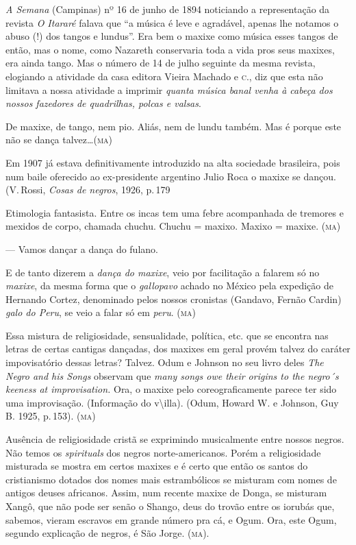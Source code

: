 \emph{A Semana} (Campinas) nº 16 de junho de 1894 noticiando a
representação da revista \emph{O Itararé} falava que ``a música é leve e
agradável, apenas lhe notamos o abuso (!) dos tangos e lundus''. Era bem
o maxixe como música esses tangos de então, mas o nome, como Nazareth
conservaria toda a vida pros seus maxixes, era ainda tango. Mas o número
de 14 de julho seguinte da mesma revista, elogiando a atividade da casa
editora Vieira Machado e \textsc{c}., diz que esta não limitava a nossa atividade
a imprimir \textit{quanta música banal venha à cabeça dos nossos fazedores de
quadrilhas, polcas e valsas}.

De maxixe, de tango, nem pio. Aliás, nem de lundu também. Mas é porque
este não se dança talvez\ldots{}(\textsc{ma})

Em 1907 já estava definitivamente introduzido na alta sociedade
brasileira, pois num baile oferecido ao ex-presidente argentino Julio
Roca o maxixe se dançou. (V.\,Rossi, \emph{Cosas de negros}, 1926, p.\,179

Etimologia fantasista. Entre os incas tem uma febre acompanhada de
tremores e mexidos de corpo, chamada chuchu. Chuchu = maxixo. Maxixo =
maxixe. (\textsc{ma})

--- Vamos dançar a dança do fulano.

E de tanto dizerem a \textit{dança do maxixe}, veio por facilitação a falarem
só no \textit{maxixe}, da mesma forma que o \textit{gallopavo} achado no México pela
expedição de Hernando Cortez, denominado pelos nossos cronistas
(Gandavo, Fernão Cardin) \textit{galo do Peru}, se veio a falar só em \textit{peru}. (\textsc{ma})

Essa mistura de religiosidade, sensualidade, política, etc. que se
encontra nas letras de certas cantigas dançadas, dos maxixes em geral
provém talvez do caráter impovisatório dessas letras? Talvez. Odum e
Johnson no seu livro deles \emph{The Negro and his Songs} observam que
\textit{many songs owe their origins to the negro´s keeness at improvisation.}
Ora, o maxixe pelo coreograficamente parece ter sido uma improvisação.
(Informação do v\textbackslash{}illa). (Odum, Howard W. e Johnson, Guy
B. 1925, p.\,153). (\textsc{ma})

Ausência de religiosidade cristã se exprimindo musicalmente entre nossos
negros. Não temos os \textit{spirituals} dos negros norte-americanos. Porém a
religiosidade misturada se mostra em certos maxixes e é certo que então
os santos do cristianismo dotados dos nomes mais estrambólicos se
misturam com nomes de antigos deuses africanos. Assim, num recente maxixe
de Donga, se misturam Xangô, que não pode ser senão o Shango, deus do
trovão entre os iorubás que, sabemos, vieram escravos em grande número pra
cá, e Ogum. Ora, este Ogum, segundo explicação de negros, é São Jorge. (\textsc{ma}).

